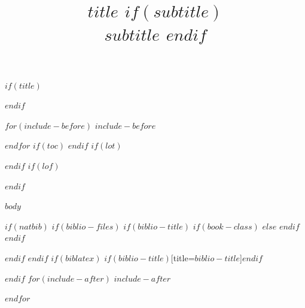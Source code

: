 \documentclass[12pt]{article}
\title{
	\vspace{0.5cm}
	{\fontsize{32}{36}\selectfont $title$}
	$if(subtitle)$
		\\\vspace{0.5em}
		{\fontsize{24}{28}\selectfont $subtitle$}
	$endif$
	\\\headrule
	\vspace{-2cm}
}
\date{}
\author{}
\begin{document}
$if(title)$\maketitle$endif$
\thispagestyle{fancyplain}

$for(include-before)$
$include-before$

$endfor$
$if(toc)$
{
\hypersetup{linkcolor=black}
\setcounter{tocdepth}{$toc-depth$}
\tableofcontents
}
$endif$
$if(lot)$
\listoftables
$endif$
$if(lof)$
\listoffigures
$endif$

$body$

$if(natbib)$
$if(biblio-files)$
$if(biblio-title)$
$if(book-class)$
\renewcommand\bibname{$biblio-title$}
$else$
\renewcommand\refname{$biblio-title$}
$endif$
$endif$


$endif$
$endif$
$if(biblatex)$
\printbibliography$if(biblio-title)$[title=$biblio-title$]$endif$

$endif$
$for(include-after)$
$include-after$

$endfor$
\end{document}
